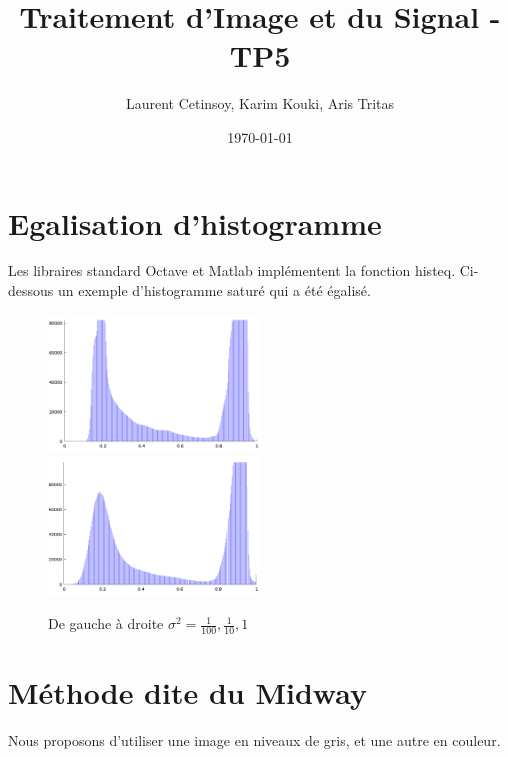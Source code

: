 \documentclass{article}
\title{Traitement d'Image et du Signal - TP5}
\author{Laurent Cetinsoy, Karim Kouki, Aris Tritas }
\date{\today}
\begin{document}
\maketitle

\section{Egalisation d'histogramme}
Les libraires standard Octave et Matlab implémentent la fonction \textsf{histeq}. Ci-dessous un exemple d'histogramme saturé qui a été égalisé.

\begin{figure}[h]
	\includegraphics[width=0.5\textwidth]{hist_orig.png}
	\includegraphics[width=0.5\textwidth]{hist_eq.png}
  \caption{De gauche à droite $\sigma^2 = \frac{1}{100}, \frac{1}{10}, 1$}
\end{figure}

\section{Méthode dite du Midway}
Nous proposons d'utiliser une image en niveaux de gris, et une autre en couleur.
\end{document}
